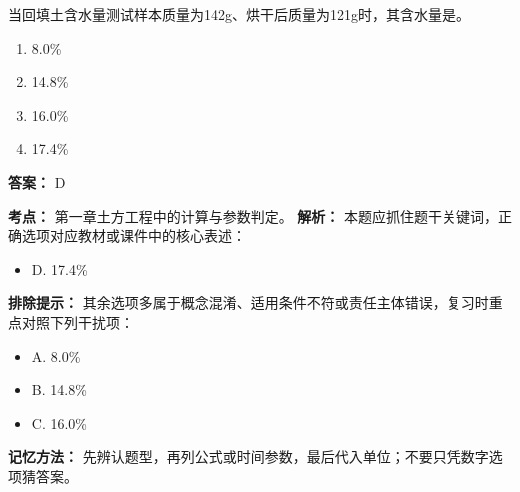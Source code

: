 \documentclass[UTF8,fontset=fandol,11pt]{ctexart}
\begin{document}
\vspace{0.2em}

\begin{quizbox}[title={第 31 题}]
当回填土含水量测试样本质量为142g、烘干后质量为121g时，其含水量是。\\
\begin{enumerate}[label=\Alph*.]
\item 8.0\%
\item 14.8\%
\item 16.0\%
\item 17.4\%
\end{enumerate}
\textbf{答案：} D
\vspace{0.25em}
\begin{answerbox}[title={考点解析}]
\textbf{考点：} 第一章土方工程中的计算与参数判定。
\textbf{解析：} 本题应抓住题干关键词，正确选项对应教材或课件中的核心表述：
\begin{itemize}
\item D. 17.4\%
\end{itemize}
\textbf{排除提示：} 其余选项多属于概念混淆、适用条件不符或责任主体错误，复习时重点对照下列干扰项：
\begin{itemize}
\item A. 8.0\%
\item B. 14.8\%
\item C. 16.0\%
\end{itemize}
\textbf{记忆方法：} 先辨认题型，再列公式或时间参数，最后代入单位；不要只凭数字选项猜答案。
\end{answerbox}
\end{quizbox}

\vspace{0.2em}
\end{document}
